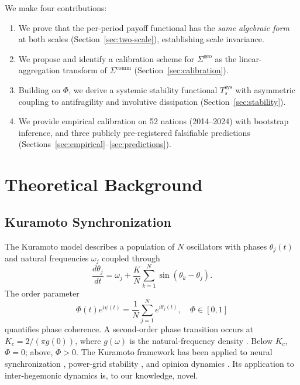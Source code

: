 \documentclass[12pt]{article}
\theoremstyle{plain}
\theoremstyle{definition}
\theoremstyle{remark}
\providecommand{\tightlist}{\setlength{\itemsep}{0pt}\setlength{\parskip}{0pt}}
\begin{document}
We make four contributions:

\begin{enumerate}\tightlist
\item We prove that the per-period payoff functional has the \emph{same algebraic form} at both scales (Section~\ref{sec:two-scale}), establishing scale invariance.
\item We propose and identify a calibration scheme for $\Sigma^{\text{geo}}$ as the linear-aggregation transform of $\Sigma^{\text{comm}}$ (Section~\ref{sec:calibration}).
\item Building on $\Phi$, we derive a systemic stability functional $T_s^{\text{sys}}$ with asymmetric coupling to antifragility and involutive dissipation (Section~\ref{sec:stability}).
\item We provide empirical calibration on 52 nations (2014--2024) with bootstrap inference, and three publicly pre-registered falsifiable predictions (Sections~\ref{sec:empirical}--\ref{sec:predictions}).
\end{enumerate}

\section{Theoretical Background}

\subsection{Kuramoto Synchronization}
\label{sec:kuramoto}

The Kuramoto model \citep{kuramoto1984} describes a population of $N$ oscillators with phases $\theta_j(t)$ and natural frequencies $\omega_j$ coupled through
\begin{equation}\label{eq:kuramoto}
\frac{d\theta_j}{dt} = \omega_j + \frac{K}{N}\sum_{k=1}^{N} \sin(\theta_k - \theta_j).
\end{equation}
The order parameter
\begin{equation}\label{eq:order-param}
\Phi(t)e^{i\psi(t)} = \frac{1}{N}\sum_{j=1}^N e^{i\theta_j(t)}, \quad \Phi \in [0, 1]
\end{equation}
quantifies phase coherence. A second-order phase transition occurs at $K_c = 2/(\pi g(0))$, where $g(\omega)$ is the natural-frequency density \citep{strogatz2000}. Below $K_c$, $\Phi = 0$; above, $\Phi > 0$. The Kuramoto framework has been applied to neural synchronization \citep{strogatz2000}, power-grid stability \citep{filatrella2008}, and opinion dynamics \citep{pluchino2006}. Its application to inter-hegemonic dynamics is, to our knowledge, novel.
\end{document}
